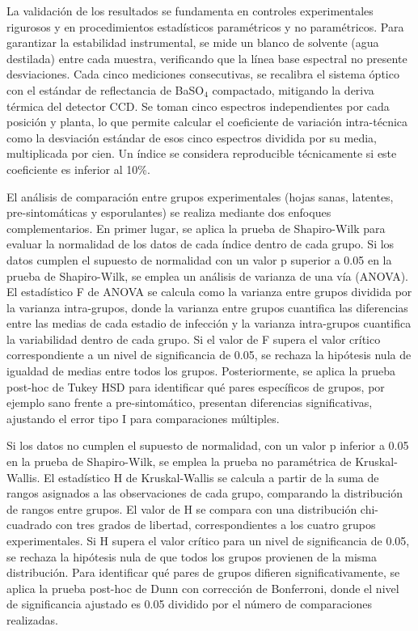 \documentclass[12pt, a4paper]{article}
\begin{document}
	La validación de los resultados se fundamenta en controles experimentales rigurosos y en procedimientos estadísticos paramétricos y no paramétricos. Para garantizar la estabilidad instrumental, se mide un blanco de solvente (agua destilada) entre cada muestra, verificando que la línea base espectral no presente desviaciones. Cada cinco mediciones consecutivas, se recalibra el sistema óptico con el estándar de reflectancia de BaSO$_4$ compactado, mitigando la deriva térmica del detector CCD. Se toman cinco espectros independientes por cada posición y planta, lo que permite calcular el coeficiente de variación intra-técnica como la desviación estándar de esos cinco espectros dividida por su media, multiplicada por cien. Un índice se considera reproducible técnicamente si este coeficiente es inferior al 10\%.
	
	El análisis de comparación entre grupos experimentales (hojas sanas, latentes, pre-sintomáticas y esporulantes) se realiza mediante dos enfoques complementarios. En primer lugar, se aplica la prueba de Shapiro-Wilk para evaluar la normalidad de los datos de cada índice dentro de cada grupo. Si los datos cumplen el supuesto de normalidad con un valor p superior a 0.05 en la prueba de Shapiro-Wilk, se emplea un análisis de varianza de una vía (ANOVA). El estadístico F de ANOVA se calcula como la varianza entre grupos dividida por la varianza intra-grupos, donde la varianza entre grupos cuantifica las diferencias entre las medias de cada estadio de infección y la varianza intra-grupos cuantifica la variabilidad dentro de cada grupo. Si el valor de F supera el valor crítico correspondiente a un nivel de significancia de 0.05, se rechaza la hipótesis nula de igualdad de medias entre todos los grupos. Posteriormente, se aplica la prueba post-hoc de Tukey HSD para identificar qué pares específicos de grupos, por ejemplo sano frente a pre-sintomático, presentan diferencias significativas, ajustando el error tipo I para comparaciones múltiples.
	
	Si los datos no cumplen el supuesto de normalidad, con un valor p inferior a 0.05 en la prueba de Shapiro-Wilk, se emplea la prueba no paramétrica de Kruskal-Wallis. El estadístico H de Kruskal-Wallis se calcula a partir de la suma de rangos asignados a las observaciones de cada grupo, comparando la distribución de rangos entre grupos. El valor de H se compara con una distribución chi-cuadrado con tres grados de libertad, correspondientes a los cuatro grupos experimentales. Si H supera el valor crítico para un nivel de significancia de 0.05, se rechaza la hipótesis nula de que todos los grupos provienen de la misma distribución. Para identificar qué pares de grupos difieren significativamente, se aplica la prueba post-hoc de Dunn con corrección de Bonferroni, donde el nivel de significancia ajustado es 0.05 dividido por el número de comparaciones realizadas.
	
\end{document}
